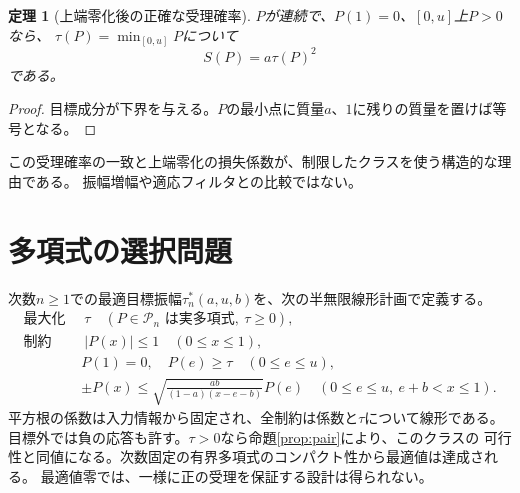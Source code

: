 \documentclass[11pt,a4paper]{article}
\newtheorem{theorem}{定理}
\newcommand{\cP}{\mathcal P}
\begin{document}
\begin{theorem}[上端零化後の正確な受理確率]\label{thm:success}
$P$が連続で、$P(1)=0$、$[0,u]$上$P>0$なら、
$\tau(P)=\min_{[0,u]}P$について
\begin{equation}\label{eq:success}
 S(P)=a\tau(P)^2
\end{equation}
である。
\end{theorem}
\begin{proof}
目標成分が下界を与える。$P$の最小点に質量$a$、$1$に残りの質量を置けば等号となる。
\end{proof}
この受理確率の一致と上端零化の損失係数が、制限したクラスを使う構造的な理由である。
振幅増幅や適応フィルタとの比較ではない。

\section{多項式の選択問題}\label{sec:design}
次数$n\geq1$での最適目標振幅$\tau_n^*(a,u,b)$を、次の半無限線形計画で定義する。
\begin{align}\label{eq:lp}
 \text{最大化 }&\ \tau\quad(P\in\cP_n\text{ は実多項式},\ \tau\geq0),\nonumber\\
 \text{制約 }&\ |P(x)|\leq1\quad(0\leq x\leq1),\nonumber\\
 &P(1)=0,\quad P(e)\geq\tau\quad(0\leq e\leq u),\\
 &\pm P(x)\leq\sqrt{\frac{ab}{(1-a)(x-e-b)}}P(e)
 \quad(0\leq e\leq u,\ e+b<x\leq1).\nonumber
\end{align}
平方根の係数は入力情報から固定され、全制約は係数と$\tau$について線形である。
目標外では負の応答も許す。$\tau>0$なら命題\ref{prop:pair}により、このクラスの
可行性と同値になる。次数固定の有界多項式のコンパクト性から最適値は達成される。
最適値零では、一様に正の受理を保証する設計は得られない。
\end{document}
